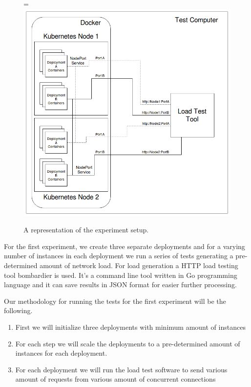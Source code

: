 \documentclass[12pt,oneandhalf,chaparabic,ceng,ms,eng,oneside,pntc]{gsufbe}
\makeatletter
\let\old@includegraphics\includegraphics
\renewcommand{\includegraphics}[2][,]{%
  \setbox9=\hbox{\old@includegraphics[#1]{#2}}%
  \ifdim\wd9>\textwidth
    \old@includegraphics[#1,width=\textwidth]{#2}%
  \else
    \old@includegraphics[#1]{#2}%
  \fi%
}
\makeatother
\begin{document}
\begin{figure}
\centering
\includegraphics[]{experiment.png}
\caption{A representation of the experiment setup.}
\label{fig:experiment}
\end{figure}

For the first experiment, we create three separate deployments and for a varying number of
instances in each deployment we run a series of tests generating a pre-determined amount of network load.
For load generation a HTTP load testing tool bombardier is used.  It's a command line tool written in
Go programming language and it can save results in JSON format for easier further processing. 

Our methodology for running the tests for the first experiment will be the following.  
\begin{enumerate}
 \item First we will initialize three deployments with minimum amount of instances
 \item For each step we will scale the deployments to a pre-determined amount of instances for each deployment.
 \item For each deployment we will run the load test software to send various amount of requests from
 various amount of concurrent connections
\end{enumerate}
\end{document}
